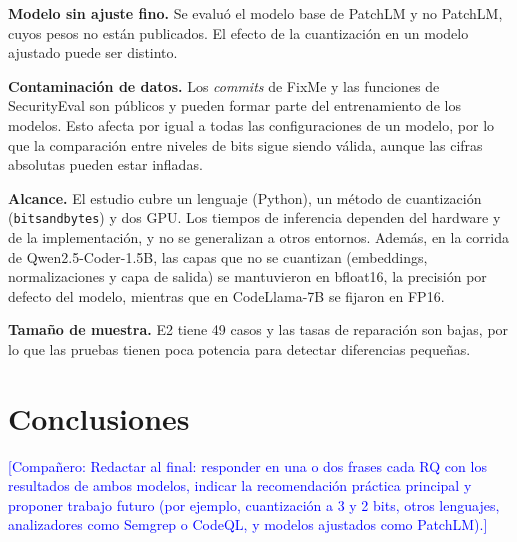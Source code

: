 \documentclass[conference]{IEEEtran}
\newcommand{\comp}[1]{\textcolor{blue}{[Compañero: #1]}}
\begin{document}
\textbf{Modelo sin ajuste fino.} Se evaluó el modelo base de PatchLM y no PatchLM, cuyos pesos no están publicados. El efecto de la cuantización en un modelo ajustado puede ser distinto.

\textbf{Contaminación de datos.} Los \emph{commits} de FixMe y las funciones de SecurityEval son públicos y pueden formar parte del entrenamiento de los modelos. Esto afecta por igual a todas las configuraciones de un modelo, por lo que la comparación entre niveles de bits sigue siendo válida, aunque las cifras absolutas pueden estar infladas.

\textbf{Alcance.} El estudio cubre un lenguaje (Python), un método de cuantización (\texttt{bitsandbytes}) y dos GPU. Los tiempos de inferencia dependen del hardware y de la implementación, y no se generalizan a otros entornos. Además, en la corrida de Qwen2.5-Coder-1.5B, las capas que no se cuantizan (embeddings, normalizaciones y capa de salida) se mantuvieron en bfloat16, la precisión por defecto del modelo, mientras que en CodeLlama-7B se fijaron en FP16.

\textbf{Tamaño de muestra.} E2 tiene 49 casos y las tasas de reparación son bajas, por lo que las pruebas tienen poca potencia para detectar diferencias pequeñas.

\section{Conclusiones}\label{sec:conclusiones}

\comp{Redactar al final: responder en una o dos frases cada RQ con los resultados de ambos modelos, indicar la recomendación práctica principal y proponer trabajo futuro (por ejemplo, cuantización a 3 y 2 bits, otros lenguajes, analizadores como Semgrep o CodeQL, y modelos ajustados como PatchLM).}



\end{document}
